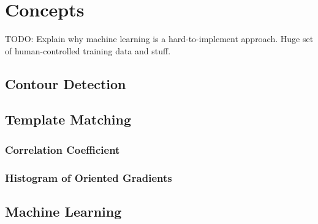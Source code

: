 %
\section{Concepts}
\label{sec_concepts}

TODO: Explain why machine learning is a hard-to-implement approach. Huge set of human-controlled training data and stuff.

\subsection{Contour Detection}
\subsection{Template Matching}
\subsubsection{Correlation Coefficient}
\subsubsection{Histogram of Oriented Gradients}
\subsection{Machine Learning}

